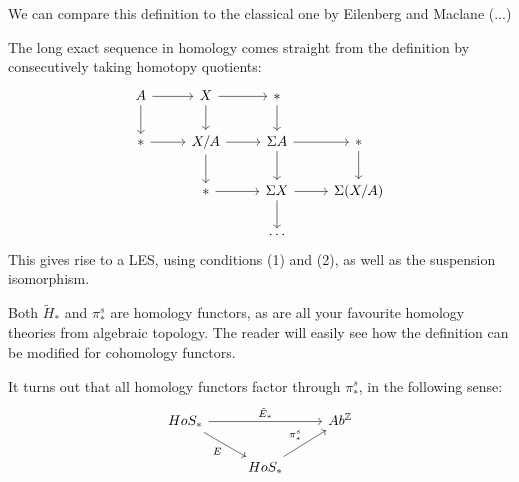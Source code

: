 
We can compare this definition to the classical one by Eilenberg and Maclane (...)

The long exact sequence in homology comes straight from the definition by consecutively taking homotopy quotients:
\[\begin{tikzcd}
A \arrow[r] \arrow[d] & X \arrow[d] \arrow[r]   & * \arrow[d]                  &             \\
* \arrow[r]           & X/A \arrow[r] \arrow[d] & \Sigma A \arrow[d] \arrow[r] & * \arrow[d] \\
                      & * \arrow[r]             & \Sigma X \arrow[r] \arrow[d] & \Sigma(X/A) \\
                      &                         & \dots                        &            
\end{tikzcd}\]
This gives rise to a LES, using conditions (1) and (2), as well as the suspension isomorphism.

Both $\tilde{H}_*$ and $\pi_*^s$ are homology functors,  %
as are all your favourite homology theories from algebraic topology. The reader will easily see how the definition can be modified for cohomology functors.

It turns out that all homology functors factor through $\pi_*^s$, in the following sense:
\[\begin{tikzcd}
HoS_* \arrow[rr, "\tilde{E}_*"] \arrow[rd, "E"'] &                             & Ab^{\Z} \\
                                                 & HoS_* \arrow[ru, "\pi_*^s"] &        
\end{tikzcd}\]

